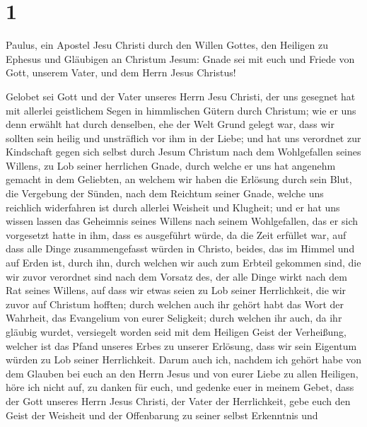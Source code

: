 \hypertarget{section}{%
\section{1}\label{section}}

 Paulus, ein Apostel Jesu Christi durch den Willen Gottes,
den Heiligen zu Ephesus und Gläubigen an Christum Jesum: 
Gnade sei mit euch und Friede von Gott, unserem Vater, und dem Herrn
Jesus Christus!

 Gelobet sei Gott und der Vater unseres Herrn Jesu
Christi, der uns gesegnet hat mit allerlei geistlichem Segen in
himmlischen Gütern durch Christum;  wie er uns denn
erwählt hat durch denselben, ehe der Welt Grund gelegt war, dass wir
sollten sein heilig und unsträflich vor ihm in der Liebe; 
und hat uns verordnet zur Kindschaft gegen sich selbst durch Jesum
Christum nach dem Wohlgefallen seines Willens,  zu Lob
seiner herrlichen Gnade, durch welche er uns hat angenehm gemacht in dem
Geliebten,  an welchem wir haben die Erlösung durch sein
Blut, die Vergebung der Sünden, nach dem Reichtum seiner Gnade,
 welche uns reichlich widerfahren ist durch allerlei
Weisheit und Klugheit;  und er hat uns wissen lassen das
Geheimnis seines Willens nach seinem Wohlgefallen, das er sich
vorgesetzt hatte in ihm,  dass es ausgeführt würde, da
die Zeit erfüllet war, auf dass alle Dinge zusammengefasst würden in
Christo, beides, das im Himmel und auf Erden ist, durch ihn,
 durch welchen wir auch zum Erbteil gekommen sind, die
wir zuvor verordnet sind nach dem Vorsatz des, der alle Dinge wirkt nach
dem Rat seines Willens,  auf dass wir etwas seien zu Lob
seiner Herrlichkeit, die wir zuvor auf Christum hofften; 
durch welchen auch ihr gehört habt das Wort der Wahrheit, das Evangelium
von eurer Seligkeit; durch welchen ihr auch, da ihr gläubig wurdet,
versiegelt worden seid mit dem Heiligen Geist der Verheißung,
 welcher ist das Pfand unseres Erbes zu unserer Erlösung,
dass wir sein Eigentum würden zu Lob seiner Herrlichkeit.
 Darum auch ich, nachdem ich gehört habe von dem Glauben
bei euch an den Herrn Jesus und von eurer Liebe zu allen Heiligen,
 höre ich nicht auf, zu danken für euch, und gedenke euer
in meinem Gebet,  dass der Gott unseres Herrn Jesus
Christi, der Vater der Herrlichkeit, gebe euch den Geist der Weisheit
und der Offenbarung zu seiner selbst Erkenntnis  und
